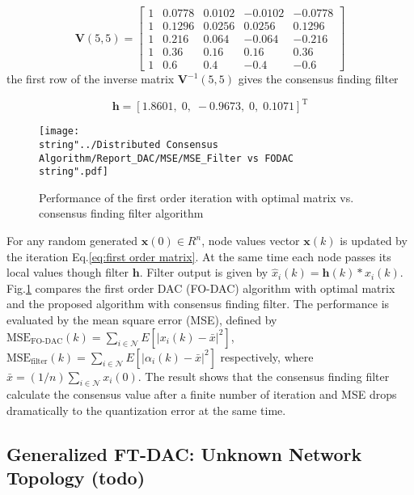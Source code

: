 \[
\mathbf{V}(5,5)=\left[\begin{array}{ccccc}
1 & 0.0778 & 0.0102 & -0.0102 & -0.0778\\
1 & 0.1296 & 0.0256 & 0.0256 & 0.1296\\
1 & 0.216 & 0.064 & -0.064 & -0.216\\
1 & 0.36 & 0.16 & 0.16 & 0.36\\
1 & 0.6 & 0.4 & -0.4 & -0.6
\end{array}\right]
\]
 the first row of the inverse matrix $\mathbf{V}^{-1}(5,5)$ gives
the consensus finding filter 

\[
\mathbf{h}=\left[1.8601,\;0,\;-0.9673,\;0,\;0.1071\right]^{\mathrm{T}}
\]


\begin{figure}
\hfill{}\texttt{[image: \\string"../Distributed Consensus Algorithm/Report\_DAC/MSE/MSE\_Filter vs FODAC\\string".pdf]}\hfill{}

\caption{\label{cap:perform. Consensus Filter}Performance of the first order
iteration with optimal matrix vs. consensus finding filter algorithm}
\end{figure}


For any random generated $\mathbf{x}(0)\in R^{n}$, node values vector
$\mathbf{x}(k)$ is updated by the iteration Eq.\eqref{eq:first order matrix}.
At the same time each node passes its local values though filter $\mathbf{h}$.
Filter output is given by $\hat{x}_{i}(k)=\mathbf{h}(k)*x_{i}(k)$.
Fig.\ref{cap:perform. Consensus Filter} compares the first order
DAC (FO-DAC) algorithm with optimal matrix and the proposed algorithm
with consensus finding filter. The performance is evaluated by the
mean square error (MSE), defined by $\mbox{MSE}_{\mbox{FO-DAC}}(k)=\sum_{i\in\mathcal{N}}E[\left|x_{i}(k)-\bar{x}\right|^{2}]$,
$\mbox{MSE}_{\mbox{filter}}(k)=\sum_{i\in\mathcal{N}}E[\left|\alpha_{i}(k)-\bar{x}\right|^{2}]$
respectively, where $\bar{x}=(1/n)\sum_{i\in\mathcal{N}}x_{i}(0)$.
The result shows that the consensus finding filter calculate the consensus
value after a finite number of iteration and MSE drops dramatically
to the quantization error at the same time. 


\subsection{Generalized FT-DAC: Unknown Network Topology (todo)}

